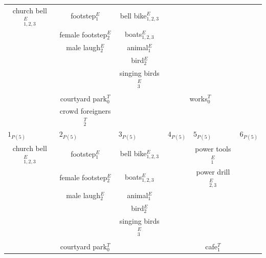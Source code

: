 \begin{table}[t]
\begin{tabular}{c|c|c|c|c|c|c}
church bell$_{1,2,3}^E$ & footstep$_{1}^E$         & bell bike$_{1,2,3}^E$ & \multicolumn{3}{c|}{}            &  \\
                        & female footstep$_{2}^E$  & boats$_{1,2,3}^E$     & \multicolumn{3}{c|}{}            & \\
                        & male laugh$_{2}^E$       & animal$_{1}^E$        & \multicolumn{3}{c|}{}            & \\
                        &                          & bird$_2^E$            & \multicolumn{3}{c|}{}            & \\
                        &                          & singing birds$_3^E$   & \multicolumn{3}{c|}{}            & \\		
                        &                          &                       & \multicolumn{3}{c|}{}            & \\	
                        & courtyard park$_0^T$     &                       & \multicolumn{3}{c|}{works$_0^T$} & \\
                        & crowd foreigners$_2^T$   &                       & \multicolumn{3}{c|}{}            & \\		
\hline
\multicolumn{1}{l|}{$1_{P(5)}$} & \multicolumn{1}{l|}{$2_{P(5)}$} & \multicolumn{1}{l|}{$3_{P(5)}$}  & \multicolumn{2}{l|}{$4_{P(5)}$} & \multicolumn{1}{l|}{$5_{P(5)}$} & \multicolumn{1}{l}{$6_{P(5)}$}\\ 
church bell$_{1,2,3}^E$  & footstep$_{1}^E$        & bell bike$_{1,2,3}^E$ & \multicolumn{2}{c|}{} & power tools$_1^E$      &  \\     
                         & female footstep$_{2}^E$ & boats$_{1,2,3}^E$     & \multicolumn{2}{c|}{} & power drill$_{2,3}^E$  & \\  
                         & male laugh$_{2}^E$      & animal$_{1}^E$        & \multicolumn{2}{c|}{} &                        &  \\  
                         &                         & bird$_2^E$            & \multicolumn{2}{c|}{} &                        &  \\     
                         &                         & singing birds$_3^E$   & \multicolumn{2}{c|}{} &                        &  \\      
                         &                         &                       & \multicolumn{2}{c|}{} &                        &  \\      
                         &  courtyard park$_0^T$   &                       & \multicolumn{2}{c|}{} & cafe$_1^T$             &  \\   

\end{tabular}
\end{table}
